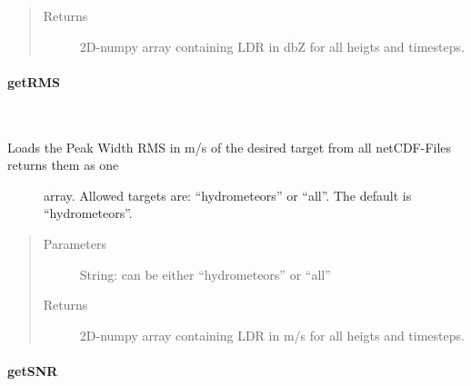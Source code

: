 \documentclass[letterpaper,10pt,english]{sphinxmanual}
\begin{document}
\begin{fulllineitems}
\begin{fulllineitems}
\begin{quote}
\begin{description}
\item[{Returns}] \leavevmode
2D-numpy array containing LDR in dbZ for all heigts and timesteps.

\end{description}\end{quote}

\end{fulllineitems}



\paragraph{getRMS}
\label{\detokenize{generated/MPPy.Instruments.Radar.Radar.getRMS:getrms}}\label{\detokenize{generated/MPPy.Instruments.Radar.Radar.getRMS::doc}}

\begin{fulllineitems}
\label{\detokenize{generated/MPPy.Instruments.Radar.Radar.getRMS:MPPy.Instruments.Radar.Radar.getRMS}}~\begin{description}
\item[{Loads the Peak Width RMS in m/s of the desired target from all netCDF-Files returns them as one}] \leavevmode
array. Allowed targets are: “hydrometeors” or “all”. The default is “hydrometeors”.

\end{description}
\begin{quote}\begin{description}
\item[{Parameters}] \leavevmode
{} \textendash{} String: can be either “hydrometeors” or “all”

\item[{Returns}] \leavevmode
2D-numpy array containing LDR in m/s for all heigts and timesteps.

\end{description}\end{quote}

\end{fulllineitems}



\paragraph{getSNR}
\label{\detokenize{generated/MPPy.Instruments.Radar.Radar.getSNR:getsnr}}\label{\detokenize{generated/MPPy.Instruments.Radar.Radar.getSNR::doc}}


\end{fulllineitems}
\end{document}
